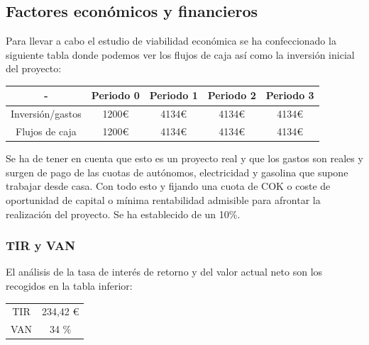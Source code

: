 \documentclass[a4paper ,12pt, onecolumn]{article}
\begin{document}
    \subsection{Factores económicos y financieros}
        Para llevar a cabo el estudio de viabilidad económica se ha confeccionado la siguiente tabla donde
        podemos ver los flujos de caja así como la inversión inicial del proyecto:
        \begin{center}
            \begin{tabular}{||c | c |c |c |c ||} 
            \hline
             - & Periodo 0 & Periodo 1& Periodo 2 & Periodo 3  \\ [0.5ex] 
            \hline
            \hline
            Inversión/gastos & 1200€ & 4134€ & 4134€ &4134€ \\ 
            Flujos de caja   & 1200€ & 4134€ & 4134€ &4134€ \\ 
            \hline
            \end{tabular}
        \end{center}
        Se ha de tener en cuenta que esto es un proyecto real y que los gastos son reales y surgen de pago de
        las cuotas de autónomos, electricidad y gasolina que supone trabajar desde casa. Con todo esto y fijando una cuota
        de COK o coste de oportunidad de capital o mínima rentabilidad admisible para afrontar la realización del
        proyecto. Se ha establecido de un 10\%.
    \subsubsection{TIR y VAN}
        El análisis de la tasa de interés de retorno y del valor actual neto son los recogidos en la tabla inferior:
        \begin{center}
            \begin{tabular}{||c | c ||} 
            \hline
            TIR & 234,42 € \\ [0.5ex] 
            VAN & 34 \%  \\ [0.5ex] 
            \hline
            \end{tabular}
        \end{center}
\end{document}
